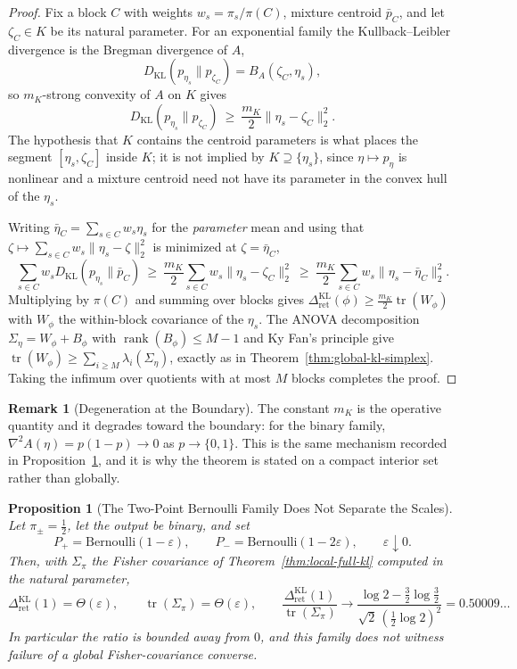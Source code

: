 \documentclass[12pt]{article}
\newtheorem{proposition}[theorem]{Proposition}
\theoremstyle{definition}
\newtheorem{remark}[theorem]{Remark}
\DeclareMathOperator{\rank}{rank}
\DeclareMathOperator{\tr}{tr}
\newcommand{\RetKL}{\Delta_{\mathrm{ret}}^{\mathrm{KL}}}
\begin{document}
\begin{proof}
Fix a block $C$ with weights $w_s=\pi_s/\pi(C)$, mixture centroid $\bar p_C$,
and let $\zeta_C\in K$ be its natural parameter.  For an exponential family the
Kullback--Leibler divergence is the Bregman divergence of $A$,
\[
D_{\mathrm{KL}}(p_{\eta_s}\|p_{\zeta_C})=B_A(\zeta_C,\eta_s),
\]
so $m_K$-strong convexity of $A$ on $K$ gives
\[
D_{\mathrm{KL}}(p_{\eta_s}\|p_{\zeta_C})\ \ge\ \frac{m_K}{2}\|\eta_s-\zeta_C\|_2^2 .
\]
The hypothesis that $K$ contains the centroid parameters is what places the
segment $[\eta_s,\zeta_C]$ inside $K$; it is not implied by $K\supseteq
\{\eta_s\}$, since $\eta\mapsto p_\eta$ is nonlinear and a mixture centroid
need not have its parameter in the convex hull of the $\eta_s$.

Writing $\bar\eta_C=\sum_{s\in C}w_s\eta_s$ for the \emph{parameter} mean and
using that $\zeta\mapsto\sum_{s\in C}w_s\|\eta_s-\zeta\|_2^2$ is minimized at
$\zeta=\bar\eta_C$,
\[
\sum_{s\in C}w_s D_{\mathrm{KL}}(p_{\eta_s}\|\bar p_C)
\ \ge\
\frac{m_K}{2}\sum_{s\in C}w_s\|\eta_s-\zeta_C\|_2^2
\ \ge\
\frac{m_K}{2}\sum_{s\in C}w_s\|\eta_s-\bar\eta_C\|_2^2 .
\]
Multiplying by $\pi(C)$ and summing over blocks gives
$\RetKL(\phi)\ge\frac{m_K}{2}\tr(W_\phi)$ with $W_\phi$ the within-block
covariance of the $\eta_s$.  The ANOVA decomposition
$\Sigma_\eta=W_\phi+B_\phi$ with $\rank(B_\phi)\le M-1$ and Ky Fan's principle
\cite{kyfan1951} give $\tr(W_\phi)\ge\sum_{i\ge M}\lambda_i(\Sigma_\eta)$,
exactly as in Theorem~\ref{thm:global-kl-simplex}.  Taking the infimum over
quotients with at most $M$ blocks completes the proof.
\end{proof}

\begin{remark}[Degeneration at the Boundary]
\label{rem:interior-fisher-boundary}
The constant $m_K$ is the operative quantity and it degrades toward the
boundary: for the binary family, $\nabla^2A(\eta)=p(1-p)\to0$ as
$p\to\{0,1\}$.  This is the same mechanism recorded in
Proposition~\ref{prop:bernoulli-fisher-scales}, and it is why the theorem is
stated on a compact interior set rather than globally.
\end{remark}

\begin{proposition}[The Two-Point Bernoulli Family Does Not Separate the Scales]
\label{prop:bernoulli-fisher-scales}
Let $\pi_\pm=\tfrac12$, let the output be binary, and set
\[
P_+=\mathrm{Bernoulli}(1-\varepsilon),
\qquad
P_-=\mathrm{Bernoulli}(1-2\varepsilon),
\qquad
\varepsilon\downarrow0 .
\]
Then, with $\Sigma_\pi$ the Fisher covariance of
Theorem~\ref{thm:local-full-kl} computed in the natural parameter,
\[
\RetKL(1)=\Theta(\varepsilon),
\qquad
\tr(\Sigma_\pi)=\Theta(\varepsilon),
\qquad
\frac{\RetKL(1)}{\tr(\Sigma_\pi)}
\longrightarrow
\frac{\log2-\tfrac32\log\tfrac32}{\sqrt2\,(\tfrac12\log2)^2}
=
0.50009\ldots
\]
In particular the ratio is bounded away from $0$, and this family does
\emph{not} witness failure of a global Fisher-covariance converse.
\end{proposition}
\end{document}
